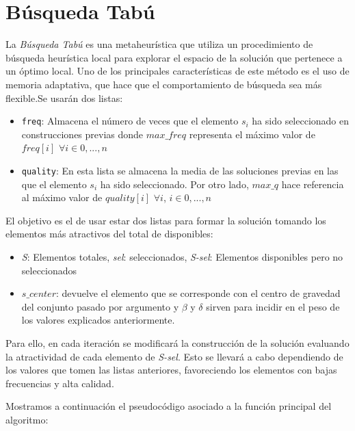 \newpage
\section{Búsqueda Tabú}

La \textit{Búsqueda Tabú} es una metaheurística que utiliza un procedimiento de búsqueda heurística local para explorar el espacio de la solución que pertenece a un óptimo local. Uno de los principales características de este método es el uso de memoria adaptativa, que hace que el comportamiento de búsqueda sea más flexible.Se usarán dos listas:
\begin{itemize}
	\item \texttt{freq}: Almacena el número de veces que el elemento $s_i$ ha sido seleccionado en construcciones previas donde $max\_freq$ representa el máximo valor de $freq[i]$ $\forall i \in {0,...,n}$
	
	\item \texttt{quality}: En esta lista se almacena la media de las soluciones previas en las que el elemento $s_i$ ha sido seleccionado. Por otro lado, $max\_q$ hace referencia al máximo valor de $quality[i]$ $\forall i$, $i \in {0,...,n}$
\end{itemize}

El objetivo es el de usar estar dos listas para formar la solución tomando los elementos más atractivos del total de disponibles: 
\begin{itemize}
	\item \textit{S}: Elementos totales, \textit{sel}: seleccionados, \textit{S-sel}: Elementos disponibles pero no seleccionados
	
	\item $s\_center$: devuelve el elemento que se corresponde con el centro de gravedad del conjunto pasado por argumento y $\beta$ y $\delta$ sirven para incidir en el peso de los valores explicados anteriormente.
\end{itemize}
Para ello, en cada iteración se modificará la construcción de la solución evaluando la atractividad de cada elemento de \textit{S-sel}. Esto se llevará a cabo dependiendo de los valores que tomen las listas anteriores, favoreciendo los elementos con bajas frecuencias y alta calidad. 

Mostramos a continuación el pseudocódigo asociado a la función principal del algoritmo:

